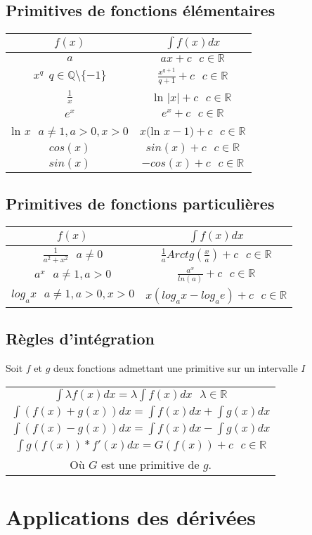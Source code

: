 \documentclass[12pt, a4paper]{book}
\begin{document}
\subsection{Primitives de fonctions élémentaires}
\begin{center}
    \begin{tabular}{|c|c|}
        \hline
       $f(x)$ & $\int f(x)dx$\\
        \hline
        $a$ & $ax+c \ \ \ c \in \mathbb{R}$\\
        $x^q \ \ q \in \mathbb{Q} \setminus \{-1\}$ & $\frac{x^{q+1}}{q+1}+c \ \ \ c \in \mathbb{R}$\\
        $\frac{1}{x}$ & ln $\lvert x \rvert + c \ \ \ c \in \mathbb{R}$\\
        $e^x$ & $e^x + c \ \ \ c \in \mathbb{R}$\\
        ln $x \ \ \ a \not = 1, a>0, x>0$& $x($ln $x-1)+c \ \ \ c \in \mathbb{R}$\\
        $cos(x)$ & $sin(x)+c \ \ \ c \in \mathbb{R}$\\
        $sin(x)$ & $-cos(x)+c \ \ \ c \in \mathbb{R}$\\
        \hline
    \end{tabular}
\end{center}
\subsection{Primitives de fonctions particulières}
\begin{center}
    \begin{tabular}{|c|c|}
        \hline
       $f(x)$ & $\int f(x)dx$\\
        \hline
        $\frac{1}{a^2+x^2} \ \ \ a \not = 0$& $\frac{1}{a}Arctg(\frac{x}{a})+c \ \ \ c \in \mathbb{R}$\\
        $a^x \ \ \ a \not = 1, a>0$& $\frac{a^x}{ln(a)}+c \ \ \ c \in \mathbb{R}$\\
        $log_ax \ \ \ a \not = 1, a>0, x>0$& $x(log_ax-log_ae)+c \ \ \ c \in \mathbb{R}$\\
    
        \hline
    \end{tabular}
\end{center}
\newpage
\subsection{Règles d'intégration}
Soit $f$ et $g$ deux fonctions admettant une primitive sur un intervalle $I$
\begin{center}
    \begin{tabular}{|c|}
        \hline
        $\int \lambda f(x)dx = \lambda \int f(x)dx \ \ \ \lambda \in \mathbb{R}$\\
        $\int (f(x)+g(x))dx = \int f(x)dx + \int g(x)dx $\\
        $\int (f(x)-g(x))dx = \int f(x)dx - \int g(x)dx $\\
        $\int g(f(x))*f'(x)dx = G(f(x)) + c \ \ \ c \in \mathbb{R}$\\
        Où $G$ est une primitive de $g$.\\
        \hline
    \end{tabular}
\end{center}
\newpage
\section{Applications des dérivées}
\end{document}
